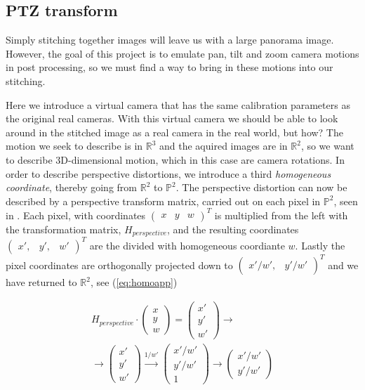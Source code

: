 \subsection{PTZ transform}
	Simply stitching together images will leave us with a large panorama image.
        However, the goal of this project is to emulate pan, tilt and zoom camera motions in post processing, so we must find a way to bring in these motions into our stitching.

	Here we introduce a virtual camera that has the same calibration parameters as the original real cameras.
	With this virtual camera we should be able to look around in the stitched image as a real camera in the real world, but how?
	The motion we seek to describe is in $\mathbb{R}^3$ and the aquired images are in $\mathbb{R}^2$, so we want to describe 3D-dimensional motion, which in this case are camera rotations.
	In order to describe perspective distortions, we introduce a third \emph{homogeneous coordinate}, thereby going from $\mathbb{R}^2$ to $\mathbb{P}^2$.
	The perspective distortion can now be described by a perspective transform matrix, carried out on each pixel in $\mathbb{P}^2$, seen in \cite{hartley2003Multiple}.
	Each pixel, with coordinates $\left( \begin{smallmatrix} x & y & w \end{smallmatrix} \right)^T$
	is multiplied from the left with the transformation matrix, $H_{perspective}$, and the resulting coordinates $ \left( \begin{smallmatrix} x', & y', & w' \end{smallmatrix} \right) ^T$ are the divided with homogeneous coordiante $w$.
	Lastly the pixel coordinates are orthogonally projected down to $\left( \begin{smallmatrix} x'/w', & y'/w' \end{smallmatrix} \right)^T$ and we have returned to $\mathbb{R}^2$, see (\ref{eq:homoapp})

	\begin{multline}
		H_{perspective}\cdot
		\begin{pmatrix}
			x \\
			y \\
			w
		\end{pmatrix}=
		\begin{pmatrix}
			x' \\
			y' \\
			w'
		\end{pmatrix} \rightarrow \\
		\rightarrow
		\begin{pmatrix}
			x' \\
			y' \\
			w'
		\end{pmatrix} \xrightarrow{1/w'}
		\begin{pmatrix}
			x'/w' \\
			y'/w' \\
			1
		\end{pmatrix} \rightarrow
		\begin{pmatrix}
			x'/w' \\
			y'/w'
		\end{pmatrix}
		\label{eq:homoapp}
	\end{multline}

